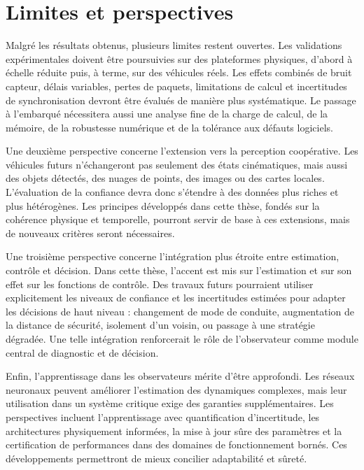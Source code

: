 \section*{Limites et perspectives}

Malgré les résultats obtenus, plusieurs limites restent ouvertes. Les validations expérimentales doivent être poursuivies sur des plateformes physiques, d'abord à échelle réduite puis, à terme, sur des véhicules réels. Les effets combinés de bruit capteur, délais variables, pertes de paquets, limitations de calcul et incertitudes de synchronisation devront être évalués de manière plus systématique. Le passage à l'embarqué nécessitera aussi une analyse fine de la charge de calcul, de la mémoire, de la robustesse numérique et de la tolérance aux défauts logiciels.

Une deuxième perspective concerne l'extension vers la perception coopérative. Les véhicules futurs n'échangeront pas seulement des états cinématiques, mais aussi des objets détectés, des nuages de points, des images ou des cartes locales. L'évaluation de la confiance devra donc s'étendre à des données plus riches et plus hétérogènes. Les principes développés dans cette thèse, fondés sur la cohérence physique et temporelle, pourront servir de base à ces extensions, mais de nouveaux critères seront nécessaires.

Une troisième perspective concerne l'intégration plus étroite entre estimation, contrôle et décision. Dans cette thèse, l'accent est mis sur l'estimation et sur son effet sur les fonctions de contrôle. Des travaux futurs pourraient utiliser explicitement les niveaux de confiance et les incertitudes estimées pour adapter les décisions de haut niveau : changement de mode de conduite, augmentation de la distance de sécurité, isolement d'un voisin, ou passage à une stratégie dégradée. Une telle intégration renforcerait le rôle de l'observateur comme module central de diagnostic et de décision.

Enfin, l'apprentissage dans les observateurs mérite d'être approfondi. Les réseaux neuronaux peuvent améliorer l'estimation des dynamiques complexes, mais leur utilisation dans un système critique exige des garanties supplémentaires. Les perspectives incluent l'apprentissage avec quantification d'incertitude, les architectures physiquement informées, la mise à jour sûre des paramètres et la certification de performances dans des domaines de fonctionnement bornés. Ces développements permettront de mieux concilier adaptabilité et sûreté.

